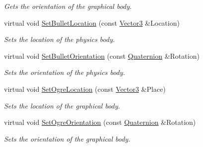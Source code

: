 \begin{DoxyCompactItemize}
\begin{DoxyCompactList}\small\item\em Gets the orientation of the graphical body. \item\end{DoxyCompactList}\item 
virtual void \hyperlink{classphys_1_1ActorBase_a5ff883ae10ba5672381485f79d6b456d}{SetBulletLocation} (const \hyperlink{classphys_1_1Vector3}{Vector3} \&Location)
\begin{DoxyCompactList}\small\item\em Sets the location of the physics body. \item\end{DoxyCompactList}\item 
virtual void \hyperlink{classphys_1_1ActorBase_a465147259c06875ca9542cf0309168eb}{SetBulletOrientation} (const \hyperlink{classphys_1_1Quaternion}{Quaternion} \&Rotation)
\begin{DoxyCompactList}\small\item\em Sets the orientation of the physics body. \item\end{DoxyCompactList}\item 
virtual void \hyperlink{classphys_1_1ActorBase_af971411076dc0caeb10868e563c49549}{SetOgreLocation} (const \hyperlink{classphys_1_1Vector3}{Vector3} \&Place)
\begin{DoxyCompactList}\small\item\em Sets the location of the graphical body. \item\end{DoxyCompactList}\item 
virtual void \hyperlink{classphys_1_1ActorBase_a3b7de85c73621ce1e74ffc9837efba90}{SetOgreOrientation} (const \hyperlink{classphys_1_1Quaternion}{Quaternion} \&Rotation)
\begin{DoxyCompactList}\small\item\em Sets the orientation of the graphical body. \item\end{DoxyCompactList}\end{DoxyCompactItemize}
